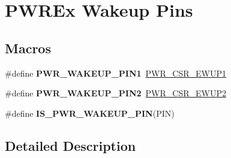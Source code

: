 \hypertarget{group___p_w_r_ex___wake_up___pins}{\section{P\-W\-R\-Ex Wakeup Pins}
\label{group___p_w_r_ex___wake_up___pins}
}
\subsection*{Macros}
\begin{DoxyCompactItemize}
\item 
\hypertarget{group___p_w_r_ex___wake_up___pins_ga0da8e7cbe0826e93b777ae4419a1cd05}{\#define {\bfseries P\-W\-R\-\_\-\-W\-A\-K\-E\-U\-P\-\_\-\-P\-I\-N1}~\hyperlink{group___peripheral___registers___bits___definition_ga2a92d9adb125e24ab1cd1a58a73efe19}{P\-W\-R\-\_\-\-C\-S\-R\-\_\-\-E\-W\-U\-P1}}\label{group___p_w_r_ex___wake_up___pins_ga0da8e7cbe0826e93b777ae4419a1cd05}

\item 
\hypertarget{group___p_w_r_ex___wake_up___pins_ga0c718de5967a8d2cec63d0b5fe0b2ada}{\#define {\bfseries P\-W\-R\-\_\-\-W\-A\-K\-E\-U\-P\-\_\-\-P\-I\-N2}~\hyperlink{group___peripheral___registers___bits___definition_ga3924963c0b869453e9be2b8f14c929dc}{P\-W\-R\-\_\-\-C\-S\-R\-\_\-\-E\-W\-U\-P2}}\label{group___p_w_r_ex___wake_up___pins_ga0c718de5967a8d2cec63d0b5fe0b2ada}

\item 
\#define {\bfseries I\-S\-\_\-\-P\-W\-R\-\_\-\-W\-A\-K\-E\-U\-P\-\_\-\-P\-I\-N}(P\-I\-N)
\end{DoxyCompactItemize}


\subsection{Detailed Description}


